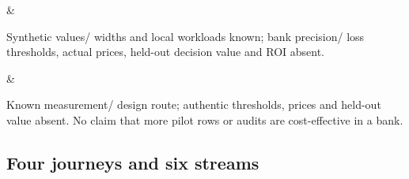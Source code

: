 \documentclass[
  10pt,
]{article}
\begin{document}
\begin{longtable}[]
\begin{minipage}[t]{\linewidth}
\end{minipage} & \begin{minipage}[t]{\linewidth}\raggedright
Synthetic values/ widths and local workloads known; bank precision/ loss
thresholds, actual prices, held-out decision value and ROI absent.\strut
\end{minipage} & \begin{minipage}[t]{\linewidth}\raggedright
Known measurement/ design route; authentic thresholds, prices and
held-out value absent. No claim that more pilot rows or audits are
cost-effective in a bank.\strut
\end{minipage}\tabularnewline
\bottomrule
\end{longtable}

\hypertarget{four-journeys-and-six-streams}{%
\subsection{Four journeys and six
streams}\label{four-journeys-and-six-streams}}
\end{document}
